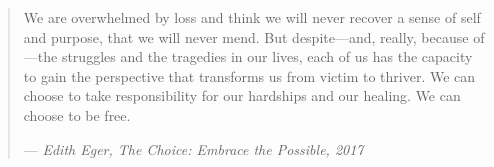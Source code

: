 \clearpage

\pagestyle{empty}

\vspace*{\fill}
\begin{quote}
    We are overwhelmed by loss and think we will never recover a sense of self and purpose, that we will never mend. But despite—and, really, because of—the struggles and the tragedies in our lives, each of us has the capacity to gain the perspective that transforms us from victim to thriver. We can choose to take responsibility for our hardships and our healing. We can choose to be free.

    — \emph{Edith Eger, The Choice: Embrace the Possible, 2017}
\end{quote}
\vspace*{\fill}

\backmatter %


